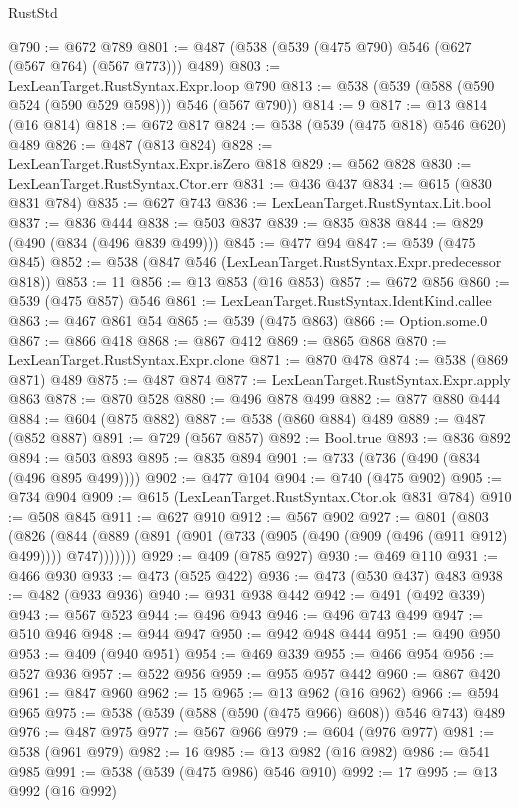 \begin{lexlean}{RustStd}
\begin{coremodule}
@790 := @672 @789
@801 := @487 (@538 (@539 (@475 @790) @546 (@627 (@567 @764) (@567 @773))) @489)
@803 := LexLeanTarget.RustSyntax.Expr.loop @790
@813 := @538 (@539 (@588 (@590 @524 (@590 @529 @598))) @546 (@567 @790))
@814 := 9
@817 := @13 @814 (@16 @814)
@818 := @672 @817
@824 := @538 (@539 (@475 @818) @546 @620) @489
@826 := @487 (@813 @824)
@828 := LexLeanTarget.RustSyntax.Expr.isZero @818
@829 := @562 @828
@830 := LexLeanTarget.RustSyntax.Ctor.err
@831 := @436 @437
@834 := @615 (@830 @831 @784)
@835 := @627 @743
@836 := LexLeanTarget.RustSyntax.Lit.bool
@837 := @836 @444
@838 := @503 @837
@839 := @835 @838
@844 := @829 (@490 (@834 (@496 @839 @499)))
@845 := @477 @94
@847 := @539 (@475 @845)
@852 := @538 (@847 @546 (LexLeanTarget.RustSyntax.Expr.predecessor @818))
@853 := 11
@856 := @13 @853 (@16 @853)
@857 := @672 @856
@860 := @539 (@475 @857) @546
@861 := LexLeanTarget.RustSyntax.IdentKind.callee
@863 := @467 @861 @54
@865 := @539 (@475 @863)
@866 := Option.some.{0}
@867 := @866 @418
@868 := @867 @412
@869 := @865 @868
@870 := LexLeanTarget.RustSyntax.Expr.clone
@871 := @870 @478
@874 := @538 (@869 @871) @489
@875 := @487 @874
@877 := LexLeanTarget.RustSyntax.Expr.apply @863
@878 := @870 @528
@880 := @496 @878 @499
@882 := @877 @880 @444
@884 := @604 (@875 @882)
@887 := @538 (@860 @884) @489
@889 := @487 (@852 @887)
@891 := @729 (@567 @857)
@892 := Bool.true
@893 := @836 @892
@894 := @503 @893
@895 := @835 @894
@901 := @733 (@736 (@490 (@834 (@496 @895 @499))))
@902 := @477 @104
@904 := @740 (@475 @902)
@905 := @734 @904
@909 := @615 (LexLeanTarget.RustSyntax.Ctor.ok @831 @784)
@910 := @508 @845
@911 := @627 @910
@912 := @567 @902
@927 := @801
    (@803
      (@826 (@844 (@889 (@891 (@901 (@733 (@905 (@490 (@909 (@496 (@911 @912) @499)))) @747)))))))
@929 := @409 (@785 @927)
@930 := @469 @110
@931 := @466 @930
@933 := @473 (@525 @422)
@936 := @473 (@530 @437) @483
@938 := @482 (@933 @936)
@940 := @931 @938 @442
@942 := @491 (@492 @339)
@943 := @567 @523
@944 := @496 @943
@946 := @496 @743 @499
@947 := @510 @946
@948 := @944 @947
@950 := @942 @948 @444
@951 := @490 @950
@953 := @409 (@940 @951)
@954 := @469 @339
@955 := @466 @954
@956 := @527 @936
@957 := @522 @956
@959 := @955 @957 @442
@960 := @867 @420
@961 := @847 @960
@962 := 15
@965 := @13 @962 (@16 @962)
@966 := @594 @965
@975 := @538 (@539 (@588 (@590 (@475 @966) @608)) @546 @743) @489
@976 := @487 @975
@977 := @567 @966
@979 := @604 (@976 @977)
@981 := @538 (@961 @979)
@982 := 16
@985 := @13 @982 (@16 @982)
@986 := @541 @985
@991 := @538 (@539 (@475 @986) @546 @910)
@992 := 17
@995 := @13 @992 (@16 @992)

\end{coremodule}
\end{lexlean}
